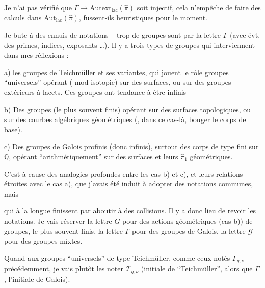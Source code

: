 Je n'ai pas vérifié que $\Gamma\longrightarrow\mathrm{Autext}_{\mathrm{lac}}(\widehat\pi)$ soit injectif, cela n'empêche de faire des calculs dans $\mathrm{Aut}_{\mathrm{lac}}(\widehat\pi)$, fussent-ils heuristiques pour le moment.



Je bute à des ennuis de notations -- trop de groupes sont  par la lettre $\Gamma$ (avec évt. des primes, indices, exposants \ldots). Il y a trois types de groupes qui interviennent dans mes réflexions :

a) les groupes de Teichmüller et ses variantes, qui jouent le rôle  groupes ``universels'' opérant ( mod isotopie) sur des surfaces, ou sur des groupes  extérieurs à lacets. Ces groupes ont tendance à être infinis

b) Des groupes (le plus souvent finis) opérant sur des surfaces topologiques, ou sur des courbes algébriques géométriques (, dans ce cas-là, bouger le corps de base).


c) Des groupes de Galois profinis (donc infinis), surtout des corps de type fini sur $\mathbb Q$, opérant ``arithmétiquement'' sur des surfaces et leurs $\widehat{\pi}_1$ géométriques.

C'est à cause des analogies profondes entre les cas b) et c), et leurs relations étroites avec le cas a), que j'avais été induit à adopter des notations communes, mais



qui à la longue finissent par aboutir à des collisions. Il y a donc lieu de revoir les notations. Je vais réserver la lettre $G$  pour des actions géométriques (cas b)) de groupes, le plus souvent finis, la lettre $\Gamma$  pour des groupes de Galois, la lettre $\mathcal G$ pour des groupes mixtes.

Quand aux groupes ``universels'' de type Teichmüller, comme ceux notés $\Gamma_{g,\nu}$ précédemment, je vais plutôt les noter  $\mathcal T_{g,\nu}$ (initiale de ``Teichmüller'', alors que $\Gamma$,   l'initiale de Galois).

